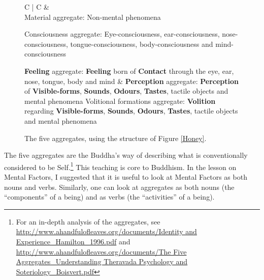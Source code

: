 \begin{figure}[H]
\begin{tabular*}{\textwidth}{C{\tabcolsep} | C{\tabcolsep}}
\toprule
{} &  \\
\midrule
Material aggregate:\newline
 Non-mental phenomena\newline\vspace{5mm}
 
 Consciousness aggregate:\newline
 Eye-consciousness, ear-consciousness, nose-consciousness, tongue-consciousness, body-consciousness and mind-consciousness\newline\vspace{5mm}
 
 \textbf{Feeling} aggregate:\newline
 \textbf{Feeling} born of \textbf{Contact} through the eye, ear, nose, tongue, body and mind
 &
 \textbf{Perception} aggregate:\newline
 \textbf{Perception} of \textbf{Visible-forms}, \textbf{Sounds}, \textbf{Odours}, \textbf{Tastes}, tactile objects and mental phenomena
 \newline\vspace{5mm}
 Volitional formations aggregate:\newline
 \textbf{Volition} regarding \textbf{Visible-forms}, \textbf{Sounds}, \textbf{Odours}, \textbf{Tastes}, tactile objects and mental phenomena
 \\
 
\bottomrule
\end{tabular*}
\caption{The five aggregates, using the structure of Figure \ref{Honey}.}
\label{Aggregates}
\end{figure}

The five aggregates are the Buddha’s way of describing what is conventionally considered to be Self.\footnote{For an in-depth analysis of the aggregates, see \url{http://www.ahandfulofleaves.org/documents/Identity and Experience_Hamilton_1996.pdf} and \url{http://www.ahandfulofleaves.org/documents/The Five Aggregates_Understanding Theravada Psychology and Soteriology_Boisvert.pdf}} This teaching is core to Buddhism. In the lesson on Mental Factors, I suggested that it is useful to look at Mental Factors as both nouns and verbs. Similarly, one can look at aggregates as both nouns (the “components” of a being) and as verbs (the “activities” of a being).

